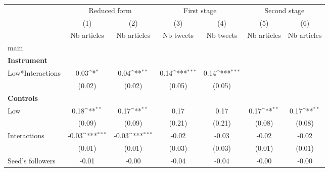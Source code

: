 {
\def\sym#1{\ifmmode^{#1}\else\(^{#1}\)\fi}
\begin{tabular}{l*{6}{c}}
\hline\hline
                    &\multicolumn{2}{c}{Reduced form}           &\multicolumn{2}{c}{First stage}            &\multicolumn{2}{c}{Second stage}           \\\cmidrule(lr){2-3}\cmidrule(lr){4-5}\cmidrule(lr){6-7}
                    &\multicolumn{1}{c}{(1)}&\multicolumn{1}{c}{(2)}&\multicolumn{1}{c}{(3)}&\multicolumn{1}{c}{(4)}&\multicolumn{1}{c}{(5)}&\multicolumn{1}{c}{(6)}\\
                    &\multicolumn{1}{c}{Nb articles}&\multicolumn{1}{c}{Nb articles}&\multicolumn{1}{c}{Nb tweets}&\multicolumn{1}{c}{Nb tweets}&\multicolumn{1}{c}{Nb articles}&\multicolumn{1}{c}{Nb articles}\\
\hline
main                &                     &                     &                     &                     &                     &                     \\
\textbf{Instrument} &                     &                     &                     &                     &                     &                     \\
Low*Interactions    &        0.03\sym{*}  &        0.04\sym{**} &        0.14\sym{***}&        0.14\sym{***}&                     &                     \\
                    &      (0.02)         &      (0.02)         &      (0.05)         &      (0.05)         &                     &                     \\
\textbf{Controls}   &                     &                     &                     &                     &                     &                     \\
Low                 &        0.18\sym{**} &        0.17\sym{**} &        0.17         &        0.17         &        0.17\sym{**} &        0.17\sym{**} \\
                    &      (0.09)         &      (0.09)         &      (0.21)         &      (0.21)         &      (0.08)         &      (0.08)         \\
Interactions        &       -0.03\sym{***}&       -0.03\sym{***}&       -0.02         &       -0.03         &       -0.02         &       -0.02         \\
                    &      (0.01)         &      (0.01)         &      (0.03)         &      (0.03)         &      (0.01)         &      (0.01)         \\
Seed’s followers    &       -0.01         &       -0.00         &       -0.04         &       -0.04         &       -0.00         &       -0.00         \\

\end{tabular}}
